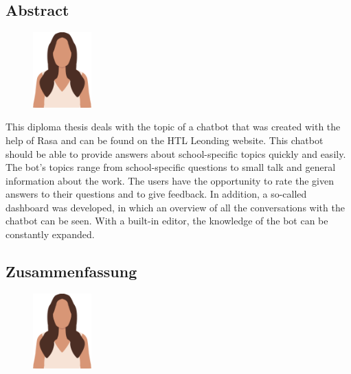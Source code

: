 \begin{spacing}{1}
    \chapter*{Abstract}
\end{spacing}
\begin{figure}
    \begin{center}
      \includegraphics[width=0.2\textwidth]{pics/LeonieTrans.png}
    \end{center}
\end{figure}
This diploma thesis deals with the topic of a chatbot that was created with the help of Rasa and can be found on the HTL Leonding website.
This chatbot should be able to provide answers about school-specific topics quickly and easily.
The bot's topics range from school-specific questions to small talk and general information about the work.
The users have the opportunity to rate the given answers to their questions and to give feedback.
In addition, a so-called dashboard was developed, in which an overview of all the conversations with the chatbot can be seen.
With a built-in editor, the knowledge of the bot can be constantly expanded.
\newpage
\begin{spacing}{1}
    \chapter*{Zusammenfassung}
\end{spacing}
\begin{figure}
    \begin{center}
      \includegraphics[width=0.2\textwidth]{pics/LeonieTrans.png}
    \end{center}
\end{figure}
